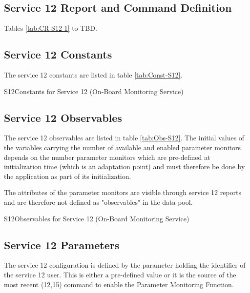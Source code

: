 \documentclass{pnp_article}
\begin{document}
\subsection{Service 12 Report and Command Definition}\label{sec:serv12RepCmdDef}
Tables \ref{tab:CR-S12-1} to TBD. 

\subsection{Service 12 Constants}\label{sec:serv12Const}
The service 12 constants are listed in table \ref{tab:Const-S12}. 

\begin{cr_const}{S12}{Constants for Service 12 (On-Board Monitoring Service)}
\end{cr_const}


\subsection{Service 12 Observables}\label{sec:serv12Obs}
The service 12 observables are listed in table \ref{tab:Obs-S12}. The initial values of the variables carrying the number of available and enabled parameter monitors depends on the number parameter monitors which are pre-defined at initialization time (which is an adaptation point) and must therefore be done by the application as part of its initialization.

The attributes of the parameter monitors are visible through service 12 reports and are therefore not defined as "observables" in the data pool.

\begin{cr_obs}{S12}{Observables for Service 12 (On-Board Monitoring Service)}
\end{cr_obs}

\newpage
\subsection{Service 12 Parameters}\label{sec:serv12Par}
The service 12 configuration is defined by the parameter holding the identifier of the service 12 user. This is either a pre-defined value or it is the source of the most recent (12,15) command to enable the Parameter Monitoring Function.
\end{document}

